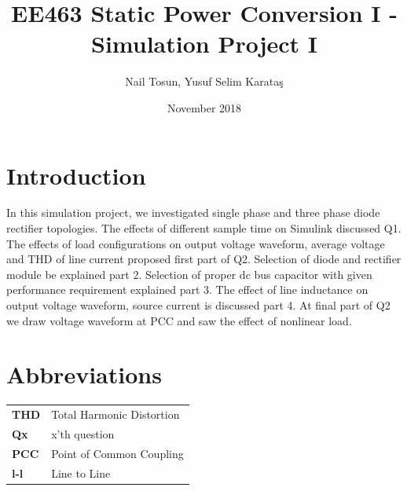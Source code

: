 \documentclass[fleqn, a4paper]{report}
\title{EE463 Static Power Conversion I 
-Simulation Project I}
\author{Nail Tosun, Yusuf Selim Karataş}
\date{November 2018}
\begin{document}
\maketitle

\section*{Introduction}
In this simulation project, we investigated single phase and three phase diode rectifier topologies. The effects of different sample time on Simulink discussed Q1. The effects of load configurations on output voltage waveform, average voltage and THD of line current proposed first part of Q2. Selection of diode and rectifier module be explained part 2. Selection of proper dc bus capacitor with given performance requirement explained part 3. The effect of line inductance on output voltage waveform, source current is discussed part 4. At final part of Q2 we draw voltage waveform at PCC and saw the effect of nonlinear load. 
\section*{Abbreviations}
\begin{table}[H]
\begin{tabular}{ll}
\textbf{THD} & Total Harmonic Distortion \\
\textbf{Qx}  & x'th question \\
\textbf{PCC} & Point of Common Coupling \\
\textbf{l-l} & Line to Line 
\end{tabular}
\end{table}
\end{document}
